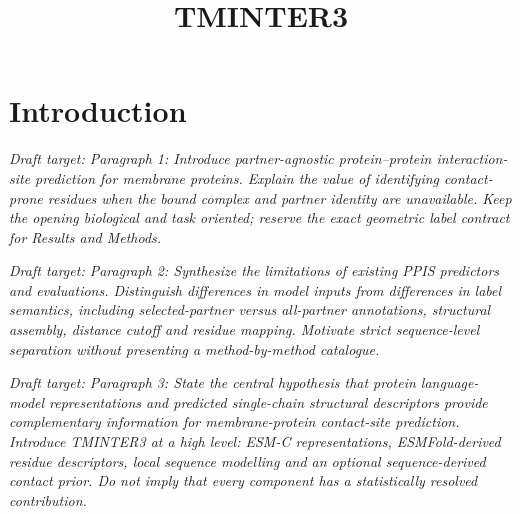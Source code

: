 \documentclass[pdflatex,sn-mathphys-num]{sn-jnl}
\newcommand{\draftplaceholder}[1]{%
  \par\smallskip\noindent
  \begingroup\color{gray}\textit{Draft target: #1}\endgroup
  \par\smallskip}
\begin{document}
\title[TMINTER3]{TMINTER3}

\author*[1]{ }
\author[1]{ }




\maketitle

\section{Introduction}\label{sec:introduction}

\draftplaceholder{Paragraph 1: Introduce partner-agnostic protein--protein
interaction-site prediction for membrane proteins. Explain the value of identifying
contact-prone residues when the bound complex and partner identity are unavailable.
Keep the opening biological and task oriented; reserve the exact geometric label
contract for Results and Methods.}

\draftplaceholder{Paragraph 2: Synthesize the limitations of existing PPIS predictors
and evaluations. Distinguish differences in model inputs from differences in label
semantics, including selected-partner versus all-partner annotations, structural
assembly, distance cutoff and residue mapping. Motivate strict sequence-level
separation without presenting a method-by-method catalogue.}

\draftplaceholder{Paragraph 3: State the central hypothesis that protein language-model
representations and predicted single-chain structural descriptors provide complementary
information for membrane-protein contact-site prediction. Introduce TMINTER3 at a high
level: ESM-C representations, ESMFold-derived residue descriptors, local sequence
modelling and an optional sequence-derived contact prior. Do not imply that every
component has a statistically resolved contribution.}
\end{document}
